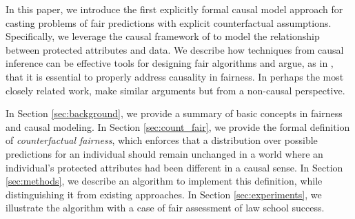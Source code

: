 % 

In this paper, we introduce the first explicitly formal causal model
approach for casting problems of fair predictions with explicit
counterfactual assumptions. Specifically, we leverage the causal framework of
\citet{pearl2009causal} to model the relationship between protected
attributes and data. We describe how techniques from causal
inference can be effective tools for designing fair algorithms and
argue, as in \citet{dedeo2014wrong}, that it is essential to properly
address causality in fairness.
In perhaps the most closely related work, \citet{johnson2016impartial}
make similar arguments but from a non-causal perspective.

In Section \ref{sec:background}, we provide a summary of basic
concepts in fairness and causal modeling. In Section
\ref{sec:count_fair}, we provide the formal definition of
\emph{counterfactual fairness}, which enforces that a distribution
over possible predictions for an individual should remain unchanged
in a world where an individual's protected attributes had been
different in a causal sense. In Section \ref{sec:methods}, we describe an
algorithm to implement this definition, while distinguishing it from
existing approaches.  In Section \ref{sec:experiments}, we illustrate
the algorithm with a case of fair assessment of law school success.

